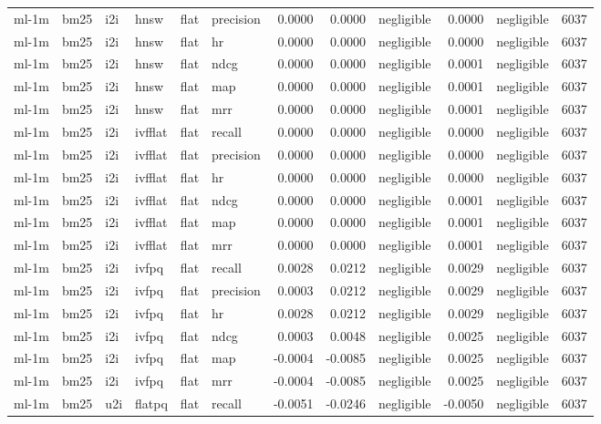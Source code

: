 \begin{tabular}{llllllrrlrlr}
ml-1m & bm25 & i2i & hnsw & flat & precision & 0.0000 & 0.0000 & negligible & 0.0000 & negligible & 6037 \\
ml-1m & bm25 & i2i & hnsw & flat & hr & 0.0000 & 0.0000 & negligible & 0.0000 & negligible & 6037 \\
ml-1m & bm25 & i2i & hnsw & flat & ndcg & 0.0000 & 0.0000 & negligible & 0.0001 & negligible & 6037 \\
ml-1m & bm25 & i2i & hnsw & flat & map & 0.0000 & 0.0000 & negligible & 0.0001 & negligible & 6037 \\
ml-1m & bm25 & i2i & hnsw & flat & mrr & 0.0000 & 0.0000 & negligible & 0.0001 & negligible & 6037 \\
ml-1m & bm25 & i2i & ivfflat & flat & recall & 0.0000 & 0.0000 & negligible & 0.0000 & negligible & 6037 \\
ml-1m & bm25 & i2i & ivfflat & flat & precision & 0.0000 & 0.0000 & negligible & 0.0000 & negligible & 6037 \\
ml-1m & bm25 & i2i & ivfflat & flat & hr & 0.0000 & 0.0000 & negligible & 0.0000 & negligible & 6037 \\
ml-1m & bm25 & i2i & ivfflat & flat & ndcg & 0.0000 & 0.0000 & negligible & 0.0001 & negligible & 6037 \\
ml-1m & bm25 & i2i & ivfflat & flat & map & 0.0000 & 0.0000 & negligible & 0.0001 & negligible & 6037 \\
ml-1m & bm25 & i2i & ivfflat & flat & mrr & 0.0000 & 0.0000 & negligible & 0.0001 & negligible & 6037 \\
ml-1m & bm25 & i2i & ivfpq & flat & recall & 0.0028 & 0.0212 & negligible & 0.0029 & negligible & 6037 \\
ml-1m & bm25 & i2i & ivfpq & flat & precision & 0.0003 & 0.0212 & negligible & 0.0029 & negligible & 6037 \\
ml-1m & bm25 & i2i & ivfpq & flat & hr & 0.0028 & 0.0212 & negligible & 0.0029 & negligible & 6037 \\
ml-1m & bm25 & i2i & ivfpq & flat & ndcg & 0.0003 & 0.0048 & negligible & 0.0025 & negligible & 6037 \\
ml-1m & bm25 & i2i & ivfpq & flat & map & -0.0004 & -0.0085 & negligible & 0.0025 & negligible & 6037 \\
ml-1m & bm25 & i2i & ivfpq & flat & mrr & -0.0004 & -0.0085 & negligible & 0.0025 & negligible & 6037 \\
ml-1m & bm25 & u2i & flatpq & flat & recall & -0.0051 & -0.0246 & negligible & -0.0050 & negligible & 6037 \\

\end{tabular}
